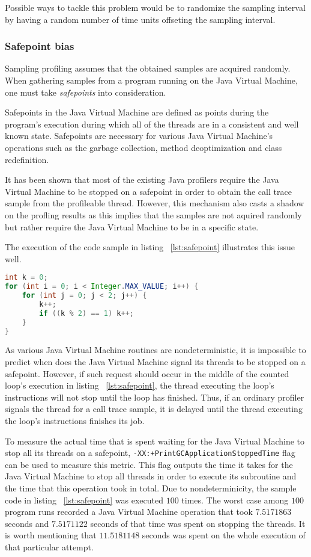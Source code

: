 \documentclass[..thesis.tex]{subfiles}
\begin{document}
Possible ways to tackle this problem would be to randomize the sampling interval by having a random number of time units offseting the sampling interval. 
\subsubsection{Safepoint bias}
Sampling profiling assumes that the obtained samples are acquired randomly. When gathering samples from a program running on the Java Virtual Machine, one must take \textit{safepoints} into consideration. 


Safepoints in the Java Virtual Machine are defined as points during the program's execution during which all of the threads are in a consistent and well known state. Safepoints are necessary for various Java Virtual Machine's operations such as the garbage collection, method deoptimization and class redefinition. \cite{hotspot_glossary}

 
It has been shown that most of the existing Java profilers require the Java Virtual Machine to be stopped on a safepoint in order to obtain the call trace sample from the profileable thread. However, this mechanism also casts a shadow on the profling results as this implies that the samples are not aquired randomly but rather require the Java Virtual Machine to be in a specific state. \cite{mytkowicz_evaluating_2010}

The execution of the code sample in listing ~\ref{lst:safepoint} illustrates this issue well. 
\begin{lstlisting}[language=java,style=def,label={lst:safepoint}, caption={Counted loops do not contain safepoints}]
int k = 0;
for (int i = 0; i < Integer.MAX_VALUE; i++) {
	for (int j = 0; j < 2; j++) {
    	k++;
    	if ((k % 2) == 1) k++;
	}
}
\end{lstlisting}
As various Java Virtual Machine routines are nondeterministic, it is impossible to predict when does the Java Virtual Machine signal its threads to be stopped on a safepoint. However, if such request should occur in the middle of the counted loop's execution in listing ~\ref{lst:safepoint}, the thread executing the loop's instructions will not stop until the loop has finished. Thus, if an ordinary profiler signals the thread for a call trace sample, it is delayed until the thread executing the loop's instructions finishes its job. 

To measure the actual time that is spent waiting for the Java Virtual Machine to stop all its threads on a safepoint, \texttt{-XX:+PrintGCApplicationStoppedTime} flag can be used to measure this metric. This flag outputs the time it takes for the Java Virtual Machine to stop all threads in order to execute its subroutine and the time that this operation took in total. Due to nondeterminicity, the sample code in listing ~\ref{lst:safepoint} was executed $100$ times. The worst case among $100$ program runs recorded a Java Virtual Machine operation that took $7.5171863$ seconds and $7.5171122$ seconds of that time was spent on stopping the threads. It is worth mentioning that $11.5181148$ seconds was spent on the whole execution of that particular attempt.
\end{document}
